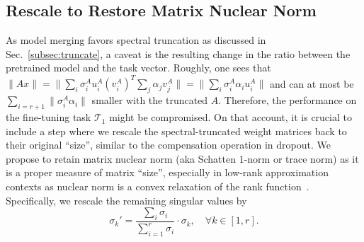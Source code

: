 \subsection{Rescale to Restore Matrix Nuclear Norm}
\label{subsec:rescale}
As model merging favors spectral truncation as discussed in Sec.~\ref{subsec:truncate}, a caveat is the resulting change in the ratio between the pretrained model and the task vector. Roughly, one sees that $\|Ax\|=\|\sum_i\sigma_i^A u_i^A (v_i^A)^T \sum_j \alpha_j v_j^A\|=\|\sum_i\sigma_i^A\alpha_i u_i^A\|$ and can at most be $\sum_{i=r+1}\|\sigma_i^A\alpha_i\|$ smaller with the truncated $A$. Therefore, the performance on the fine-tuning task $\mathcal{T}_1$ might be compromised. 
On that account, it is crucial to include a step where we rescale the spectral-truncated weight matrices back to their original ``size'', similar to the compensation operation in dropout. We propose to retain matrix nuclear norm (aka Schatten $1$-norm or trace norm) as it is a proper measure of matrix ``size'', especially in low-rank approximation contexts as nuclear norm is a convex relaxation of the rank function~\cite{candes2012exact}.
Specifically, we rescale the remaining singular values by
\[
\sigma_k' = \frac{\sum_i \sigma_i}{\sum_{i=1}^r \sigma_i} \cdot \sigma_k, \quad \forall k \in [1, r].
\]

\newcommand{\ra}[1]{\renewcommand{\arraystretch}{#1}}